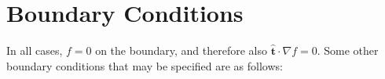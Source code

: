 \newcommand{\dt}{\ensuremath{\delta t}}
\newcommand{\ddt}[1]{\frac{\partial #1}{\partial t}}
\newcommand{\thimp}{\ensuremath{\theta}}

\newcommand{\order}[1]{\ensuremath{\mathcal{O}(#1)}}

\renewcommand{\vec}[1]{\ensuremath{\mathbf{#1}}}
\newcommand{\tensor}[1]{\mathsf{#1}}
\newcommand{\tor}{\varphi}              %
\newcommand{\A}{\vec{A}}
\newcommand{\B}{\vec{B}}
\newcommand{\E}{\vec{E}}
\newcommand{\R}{\vec{R}}
\newcommand{\x}{\vec{x}}
\renewcommand{\r}{R}
\renewcommand{\v}{\vec{v}}
\renewcommand{\u}{\vec{u}}
\newcommand{\F}{\vec{F}}
\renewcommand{\j}{\vec{J}}
\newcommand{\q}{\vec{q}}
\newcommand{\g}{\vec{g}}
\newcommand{\jn}{\frac{\j}{n}}
\renewcommand{\P}{\tensor{\Pi}}
\renewcommand{\b}{\vec{b}}
\newcommand{\W}{\tensor{W}}
\newcommand{\codename}{\textsc{M3D-$C^1$}}

\newcommand{\grad}[1]{\nabla #1}
\newcommand{\gradp}[1]{\nabla_\perp #1}
\renewcommand{\div}[1]{\nabla \cdot #1}
\newcommand{\divp}[1]{\nabla_\perp \cdot #1}
\newcommand{\curl}[1]{\nabla \times #1}

\newcommand{\dotdot}{:}
\newcommand{\dottimes}{\dot\times}
\newcommand{\timestimes}{\stackrel{\times}{\times}}

\newcommand{\gs}[1]{\Delta^* #1}
\newcommand{\lp}[1]{\nabla^2 #1}
\newcommand{\pb}[2]{\left[#1,#2\right]}
\newcommand{\ip}[2]{\left\langle  #1,#2\right\rangle}
\newcommand{\funcss}[2]{
  \left\langle\left\langle #1,#2 \right\rangle\right\rangle}
\newcommand{\funcsa}[2]{\left[\left\langle #1,#2 \right\rangle\right]}
\newcommand{\funcaa}[2]{\left[\left[ #1,#2 \right]\right]}

\newcommand{\cola}[1]{\textcolor{red}{#1}}
\newcommand{\colb}[1]{\textcolor{blue}{#1}}

\newcommand{\uvec}[1]{\ensuremath{\vec{\hat{#1}}}}
\newcommand{\n}{\ensuremath{\uvec{n}}}


\newcommand{\repositoryloc}{portal.pppl.gov/p/tsc/C1/svn}
\newcommand{\svnurl}{http://subversion.tigris.org/}


\section{Boundary Conditions}

In all cases, $f = 0$ on the boundary, and therefore also $\uvec{t}
\cdot \grad{f} = 0$.  Some other boundary conditions that may be
specified are as follows:

